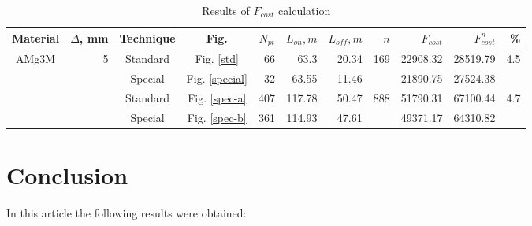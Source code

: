 \documentclass[runningheads]{llncs}
\begin{document}
\begin{table}
  \begin{tabular}{c r | c c | r r r | r | r r | r}
  Material & $\Delta$, mm & Technique & Fig. & $N_{pt}$ & $L_{on}, m$ & $L_{off}, m$ & $n$ & $F_{cost}$ & $F^n_{cost}$ & \% \\
  \hline \hline
  \multirow{4}{*}{AMg3M} & \multirow{4}{*}{5} & Standard & Fig. \ref{std}     & 66  & 63.3   & 20.34 & \multirow{2}{*}{169} & 22908.32 & 28519.79 & \multirow{2}{*}{4.5} \\
                         &                    & Special  & Fig. \ref{special} & 32  & 63.55  & 11.46 &                      & 21890.75 & 27524.38 & \\
                         &                    & Standard & Fig. \ref{spec-a}  & 407 & 117.78 & 50.47 & \multirow{2}{*}{888} & 51790.31 & 67100.44 & \multirow{2}{*}{4.7}\\
                         &                    & Special  & Fig. \ref{spec-b}  & 361 & 114.93 & 47.61 &                      & 49371.17 & 64310.82 & \\
  \hline
  \end{tabular}
  \caption{Results of $F_{cost}$ calculation}
  \label{f-cost}
\end{table}

\section{Conclusion}

In this article the following results were obtained:
\end{document}
